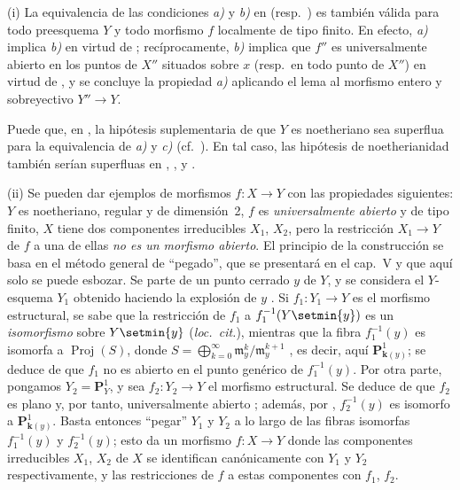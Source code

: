 \begin{remarks}[14.4.10]
\label{IV.14.4.10}
(i) La equivalencia de las condiciones \emph{a)} y \emph{b)} en  (resp.\ ) es también válida para todo preesquema $Y$ y todo morfismo $f$ localmente de tipo finito.
En efecto, \emph{a)} implica \emph{b)} en virtud de ; recíprocamente, \emph{b)} implica que $f''$ es universalmente abierto en los puntos de $X''$ situados sobre $x$ (resp.\ en todo punto de $X''$) en virtud de , y se concluye la propiedad \emph{a)} aplicando el lema  al morfismo entero y sobreyectivo $Y''\to Y$.

Puede que, en , la hipótesis suplementaria de que $Y$ es noetheriano sea superflua para la equivalencia de \emph{a)} y \emph{c)} (cf.\ ).
En tal caso, las hipótesis de noetherianidad también serían superfluas en , ,  y .

(ii) Se pueden dar ejemplos de morfismos $f:X\to Y$ con las propiedades siguientes: $Y$ es noetheriano, regular y de dimensión~2, $f$ es \emph{universalmente abierto} y de tipo finito, $X$ tiene dos componentes irreducibles $X_1$, $X_2$, pero la restricción $X_1\to Y$ de $f$ a una de ellas \emph{no es un morfismo abierto}.
El principio de la construcción se basa en el método general de ``pegado'', que se presentará en el cap.~V y que aquí solo se puede esbozar.
Se parte de un punto cerrado $y$ de $Y$, y se considera el $Y$-esquema $Y_1$ obtenido haciendo la explosión de $y$ . Si $f_1:Y_1\to Y$ es el morfismo estructural, se sabe que la restricción de $f_1$ a $f_1^{-1}(Y\setmin\{y\})$ es un \emph{isomorfismo} sobre $Y\setmin\{y\}$ (\emph{loc.\ cit.}), mientras que la fibra $f_1^{-1}(y)$ es isomorfa a $\operatorname{Proj}(S)$, donde $S=\bigoplus_{k=0}^{\infty}\mathfrak m_y^k/\mathfrak m_y^{k+1}$ , es decir, aquí $\mathbf P^1_{\mathbf{k}(y)}$; se deduce de  que $f_1$ no es abierto en el punto genérico de $f_1^{-1}(y)$.
Por otra parte, pongamos $Y_2=\mathbf P^1_Y$, y sea $f_2:Y_2\to Y$ el morfismo estructural. Se deduce de  que $f_2$ es plano y, por tanto, universalmente abierto ; además, por , $f_2^{-1}(y)$ es isomorfo a $\mathbf P^1_{\mathbf{k}(y)}$. Basta entonces ``pegar'' $Y_1$ y $Y_2$ a lo largo de las fibras isomorfas $f_1^{-1}(y)$ y $f_2^{-1}(y)$; esto da un morfismo $f:X\to Y$ donde las componentes irreducibles $X_1$, $X_2$ de $X$ se identifican canónicamente con $Y_1$ y $Y_2$ respectivamente, y las restricciones de $f$ a estas componentes con $f_1$, $f_2$.


\end{remarks}
